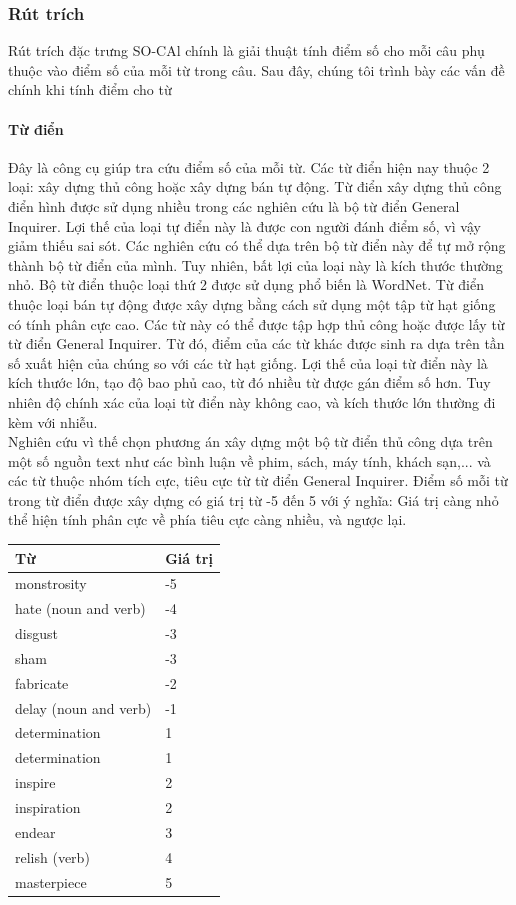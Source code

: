 \subsubsection*{Rút trích}
Rút trích đặc trưng SO-CAl chính là giải thuật tính điểm số cho mỗi câu phụ thuộc vào điểm số của mỗi từ trong câu. Sau đây, chúng tôi trình bày các vấn đề chính khi tính điểm cho từ
\paragraph*{Từ điển}
Đây là công cụ giúp tra cứu điểm số của mỗi từ. Các từ điển hiện nay thuộc 2 loại: xây dựng thủ công hoặc xây dựng bán tự động. Từ điển xây dựng thủ công điển hình được sử dụng nhiều trong các nghiên cứu là bộ từ điển General Inquirer. Lợi thế của loại tự điển này là được con người đánh điểm số, vì vậy giảm thiếu sai sót. Các nghiên cứu có thể dựa trên bộ từ điển này để tự mở rộng thành bộ từ điển của mình. Tuy nhiên, bất lợi của loại này là kích thước thường nhỏ. Bộ từ điển thuộc loại thứ 2 được sử dụng phổ biến là WordNet. Từ điển thuộc loại bán tự động được xây dựng bằng cách sử dụng một tập từ hạt giống có tính phân cực cao. Các từ này có thể được tập hợp thủ công hoặc được lấy từ từ điển General Inquirer. Từ đó, điểm của các từ khác được sinh ra dựa trên tần số xuất hiện của chúng so với các từ hạt giống. Lợi thế của loại từ điển này là kích thước lớn, tạo độ bao phủ cao, từ đó nhiều từ được gán điểm số hơn. Tuy nhiên độ chính xác của loại từ điển này không cao, và kích thước lớn thường đi kèm với nhiễu. \\

Nghiên cứu \cite{taboada2011lexicon} vì thế chọn phương án xây dựng một bộ từ điển thủ công dựa trên một số nguồn text như các bình luận về phim, sách, máy tính, khách sạn,... và các từ thuộc nhóm tích cực, tiêu cực từ từ điển General Inquirer. Điểm số mỗi từ trong từ điển được xây dựng có giá trị từ -5 đến 5 với ý nghĩa: Giá trị càng nhỏ thể hiện tính phân cực về phía tiêu cực càng nhiều, và ngược lại. 
\begin{table}[H]
\begin{tabular}{l l}
\hline
\textbf{Từ} & \textbf{Giá trị} 
\\ \hline
monstrosity & -5
\\ 
hate (noun and verb) & -4
\\ 
disgust & -3
\\ 
sham & -3
\\ 
fabricate & -2
\\ 
delay (noun and verb) & -1
\\
determination & 1
\\
determination & 1
\\ 
inspire & 2
\\ 
inspiration & 2
\\ 
endear & 3
\\ 
relish (verb) & 4
\\ 
masterpiece & 5
\\ \hline
\end{tabular}
\end{table}
